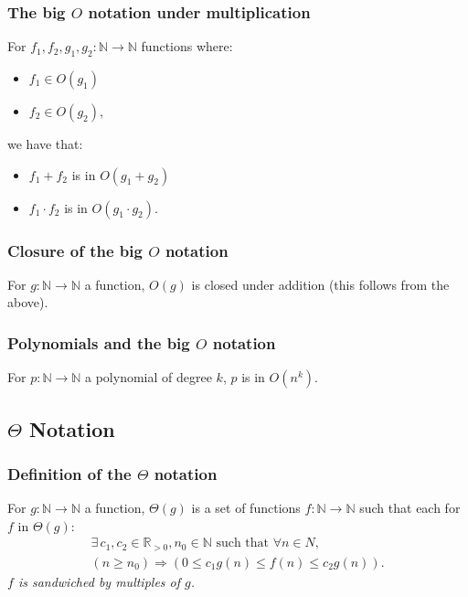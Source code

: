 \documentclass[a4paper, 12pt, twoside]{article}
\begin{document}
\subsubsection{The big $O$ notation under multiplication}

For $f_1, f_2, g_1, g_2 : \mathbb{N} \to \mathbb{N}$ functions where:
\begin{itemize}
      \item $f_1 \in O(g_1)$
      \item $f_2 \in O(g_2)$,
\end{itemize}
we have that:
\begin{itemize}
      \item $f_1 + f_2$ is in $O(g_1 + g_2)$
      \item $f_1 \cdot f_2$ is in $O(g_1 \cdot g_2)$.
\end{itemize}

\subsubsection{Closure of the big $O$ notation}

For $g : \mathbb{N} \to \mathbb{N}$ a function, $O(g)$ is closed
under addition (this follows from the above).

\subsubsection{Polynomials and the big $O$ notation}

For $p : \mathbb{N} \to \mathbb{N}$ a polynomial of degree $k$,
$p$ is in $O(n^k)$.

\subsection{$\Theta$ Notation}

\subsubsection{Definition of the $\Theta$ notation}

For $g : \mathbb{N} \to \mathbb{N}$ a function, $\Theta(g)$ is a set of
functions $f : \mathbb{N} \to \mathbb{N}$ such that each for
$f$ in $\Theta(g)$:
\begin{gather*}
      \exists \, c_1, c_2 \in \mathbb{R}_{> 0}, n_0 \in \mathbb{N}
      \text{ such that } \forall n \in N, \\
      (n \geq n_0) \Rightarrow (0 \leq c_1g(n) \leq f(n) \leq c_2g(n)).
\end{gather*}
\textit{$f$ is sandwiched by multiples of $g$.}
\end{document}
